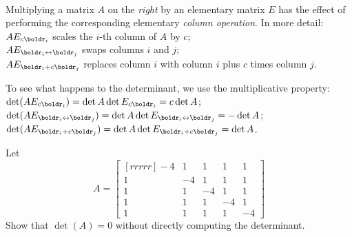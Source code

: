 \ \\
\begin{solution}
\noindent
Multiplying a matrix $A$ on the {\em right} by an elementary matrix $E$ has the effect of performing the corresponding elementary {\em column operation}. In more detail:
\\
$AE_{c\boldr_i}$ scales the $i$-th column of $A$ by $c$;
\\
$AE_{\boldr_i\leftrightarrow \boldr_j}$ swaps columns $i$ and $j$;
\\
$AE_{\boldr_i+c\boldr_j}$ replaces column $i$ with column $i$ plus $c$ times column $j$. 

To see what happens to the determinant, we use the multiplicative property: 
\\
$\det(AE_{c\boldr_i})=\det A\det E_{c\boldr_i}=c\det A$;
\\
$\det(AE_{\boldr_i\leftrightarrow \boldr_j})=\det A\det E_{\boldr_i\leftrightarrow \boldr_j}=-\det A$;
\\
$\det(AE_{\boldr_i+c\boldr_j})=\det A\det E_{\boldr_i+c\boldr_j}=\det A$.
\end{solution}
\ii Let 
\[
A=\begin{bmatrix}[rrrrr]
-4&1&1&1&1\\
1&-4&1&1&1\\
1&1&-4&1&1\\
1&1&1&-4&1\\
1&1&1&1&-4
\end{bmatrix}
\]
Show that $\det(A) = 0$ without directly computing the determinant.
\\

